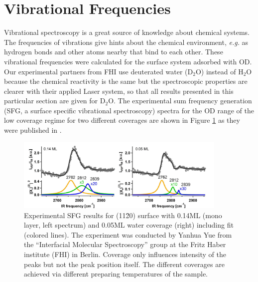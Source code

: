 \documentclass[11pt,DIV=13,BCOR=5mm,a4paper,headinclude]{scrbook}
\begin{document}
\clearpage
\section{Vibrational Frequencies}\label{sec:vib11-20}

Vibrational spectroscopy is a great source of knowledge about chemical systems.
The frequencies of vibrations give hints about the chemical environment, \textit{e.g.} as hydrogen bonds and other atoms nearby that bind to each other.
These vibrational frequencies were calculated for the surface system adsorbed with OD.
Our experimental partners from FHI use deuterated water (D$_2$O) instead of H$_2$O because the chemical reactivity is the same but the spectroscopic properties are clearer with their applied Laser system, so that all results presented in this particular section are given for D$_2$O.
The experimental sum frequency generation (SFG, a surface specific vibrational spectroscopy) spectra for the OD range of the low coverage regime for two different coverages are shown in Figure \ref{abb:exp-sfg} as they were published in \cite{Heiden11-20_2018}.
\begin{figure}[!h]
 \centering
\includegraphics[width=0.9\textwidth]{figures/11-20/SFG_fit.jpg}
 \caption{Experimental SFG results for (11\=20) surface with 0.14ML (mono layer, left spectrum) and 0.05ML water coverage (right) including fit (colored lines).
The experiment was conducted by Yanhua Yue from the ``Interfacial Molecular Spectroscopy'' group at the Fritz Haber institute (FHI) in Berlin.
Coverage only influences intensity of the peaks but not the peak position itself.
The different coverages are achieved via different preparing temperatures of the sample.}
        \label{abb:exp-sfg}
 \end{figure}
\end{document}
